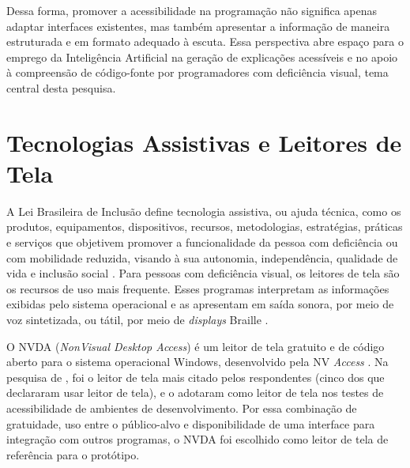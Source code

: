 \documentclass[
    12pt,                   %
    openright,              %
    oneside,                %
    a4paper,                %
    sumario=tradicional,    %
    english,                %
    brazil,                 %
    ]{abntex2}
\begin{document}
Dessa forma, promover a acessibilidade na programação não significa apenas adaptar interfaces existentes, mas também apresentar a informação de maneira estruturada e em formato adequado à escuta. Essa perspectiva abre espaço para o emprego da Inteligência Artificial na geração de explicações acessíveis e no apoio à compreensão de código-fonte por programadores com deficiência visual, tema central desta pesquisa.

\section{Tecnologias Assistivas e Leitores de Tela}\label{sec:TecAssistivas}

A Lei Brasileira de Inclusão define tecnologia assistiva, ou ajuda técnica, como os produtos, equipamentos, dispositivos, recursos, metodologias, estratégias, práticas e serviços que objetivem promover a funcionalidade da pessoa com deficiência ou com mobilidade reduzida, visando à sua autonomia, independência, qualidade de vida e inclusão social \cite{brasil2015lbi}. Para pessoas com deficiência visual, os leitores de tela são os recursos de uso mais frequente. Esses programas interpretam as informações exibidas pelo sistema operacional e as apresentam em saída sonora, por meio de voz sintetizada, ou tátil, por meio de \textit{displays} Braille \cite{nvaccess2026guia}.

O NVDA (\textit{NonVisual Desktop Access}) é um leitor de tela gratuito e de código aberto para o sistema operacional Windows, desenvolvido pela NV \textit{Access} \cite{nvaccess2026guia}. Na pesquisa de \textcite{latinoware20457}, foi o leitor de tela mais citado pelos respondentes (cinco dos que declararam usar leitor de tela), e \textcite{latinoware6969} o adotaram como leitor de tela nos testes de acessibilidade de ambientes de desenvolvimento. Por essa combinação de gratuidade, uso entre o público-alvo e disponibilidade de uma interface para integração com outros programas, o NVDA foi escolhido como leitor de tela de referência para o protótipo.
\end{document}
